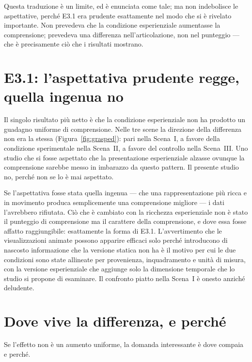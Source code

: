 Questa traduzione è un limite, ed è enunciata come tale; ma non indebolisce le aspettative, perché E3.1 era prudente esattamente nel modo che si è rivelato importante. Non prevedeva che la condizione esperienziale aumentasse la comprensione; prevedeva una differenza nell'articolazione, non nel punteggio --- che è precisamente ciò che i risultati mostrano.

\section{E3.1: l'aspettativa prudente regge, quella ingenua no}
\label{sec:disc-e31}

Il singolo risultato più netto è che la condizione esperienziale non ha prodotto un guadagno uniforme di comprensione. Nelle tre scene la direzione della differenza non era la stessa (Figura~\ref{fig:grasped}): pari nella Scena~I, a favore della condizione sperimentale nella Scena~II, a favore del controllo nella Scena~III. Uno studio che si fosse aspettato che la presentazione esperienziale alzasse ovunque la comprensione sarebbe messo in imbarazzo da questo pattern. Il presente studio no, perché non se lo è mai aspettato.

Se l'aspettativa fosse stata quella ingenua --- che una rappresentazione più ricca e in movimento produca semplicemente una comprensione migliore --- i dati l'avrebbero rifiutata. Ciò che è cambiato con la ricchezza esperienziale non è stato il punteggio di comprensione ma il carattere della comprensione, e dove essa fosse affatto raggiungibile: esattamente la forma di E3.1. L'avvertimento che le visualizzazioni animate possono apparire efficaci solo perché introducono di nascosto informazione che la versione statica non ha \parencite{tversky2002} è il motivo per cui le due condizioni sono state allineate per provenienza, inquadramento e unità di misura, con la versione esperienziale che aggiunge solo la dimensione temporale che lo studio si propone di esaminare. Il confronto piatto nella Scena~I è onesto anziché deludente.

\section{Dove vive la differenza, e perché}
\label{sec:disc-mechanism}

Se l'effetto non è un aumento uniforme, la domanda interessante è dove compaia e perché.

